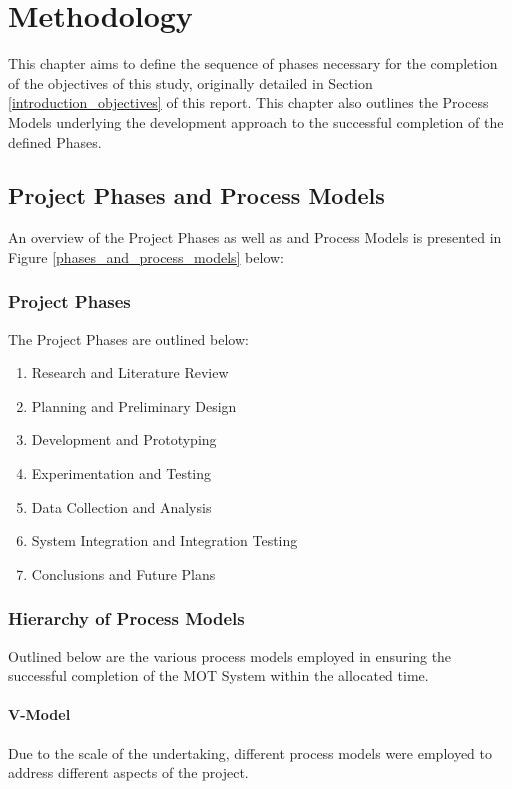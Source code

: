 \chapter{Methodology}\label{methodology}
This chapter aims to define the sequence of phases necessary for the completion
of the objectives of this study, originally detailed in Section
\ref{introduction_objectives} of this report.
This chapter also outlines the Process Models underlying the development
approach to the successful completion of the defined Phases.

\section{Project Phases and Process Models}
An overview of the Project Phases as well as and Process Models is presented in
Figure \ref{phases_and_process_models} below:

\subsection{Project Phases}
The Project Phases are outlined below:
\begin{enumerate}
    \item Research and Literature Review
    \item Planning and Preliminary Design
    \item Development and Prototyping 
    \item Experimentation and Testing
    \item Data Collection and Analysis
    \item System Integration and Integration Testing
    \item Conclusions and Future Plans
\end{enumerate}

\subsection{Hierarchy of Process Models}
Outlined below are the various process models employed in ensuring the
successful completion of the MOT System within the allocated time.

\subsubsection{V-Model}
Due to the scale of the undertaking, different process models were employed to
address different aspects of the project.

